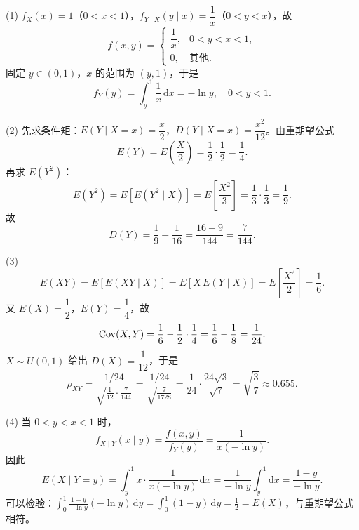 (1) $f_X(x)=1$（$0<x<1$），$f_{Y\mid X}(y\mid x)=\dfrac1x$（$0<y<x$），故
\[
f(x,y)=\begin{cases}\dfrac1x,&0<y<x<1,\\[4pt]0,&\text{其他}.\end{cases}
\]
固定 $y\in(0,1)$，$x$ 的范围为 $(y,1)$，于是
\[
f_Y(y)=\int_y^1\frac1x\,\mathrm{d}x=-\ln y,\quad 0<y<1.
\]

(2) 先求条件矩：$E(Y\mid X=x)=\dfrac{x}{2}$，$D(Y\mid X=x)=\dfrac{x^2}{12}$。由重期望公式
\[
E(Y)=E\!\left(\frac{X}{2}\right)=\frac12\cdot\frac12=\frac14.
\]
再求 $E(Y^2)$：
\[
E(Y^2)=E[E(Y^2\mid X)]
=E\!\left[\frac{X^2}{3}\right]=\frac13\cdot\frac13=\frac19.
\]
故
\[
D(Y)=\frac19-\frac1{16}=\frac{16-9}{144}=\frac7{144}.
\]

(3)
\[
E(XY)=E[E(XY\mid X)]=E[X\,E(Y\mid X)]
=E\!\left[\frac{X^2}{2}\right]=\frac16.
\]
又 $E(X)=\dfrac12$，$E(Y)=\dfrac14$，故
\[
\operatorname{Cov}(X,Y)=\frac16-\frac12\cdot\frac14=\frac16-\frac18=\frac1{24}.
\]
$X\sim U(0,1)$ 给出 $D(X)=\dfrac1{12}$，于是
\[
\rho_{XY}=\frac{1/24}{\sqrt{\frac1{12}\cdot\frac7{144}}}
=\frac{1/24}{\sqrt{\frac7{1728}}}
=\frac{1}{24}\cdot\frac{24\sqrt3}{\sqrt7}
=\sqrt{\frac37}\approx0.655.
\]

(4) 当 $0<y<x<1$ 时，
\[
f_{X\mid Y}(x\mid y)=\frac{f(x,y)}{f_Y(y)}=\frac{1}{x(-\ln y)}.
\]
因此
\[
E(X\mid Y=y)=\int_y^1 x\cdot\frac{1}{x(-\ln y)}\,\mathrm{d}x
=\frac{1}{-\ln y}\int_y^1\mathrm{d}x
=\frac{1-y}{-\ln y}.
\]
可以检验：$\displaystyle\int_0^1\frac{1-y}{-\ln y}(-\ln y)\,\mathrm{d}y=\int_0^1(1-y)\,\mathrm{d}y=\frac12=E(X)$，与重期望公式相符。


\else \answerarea[10] \fi
